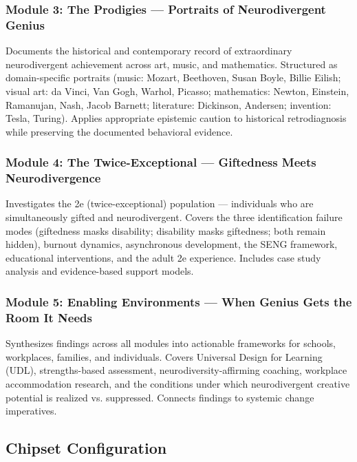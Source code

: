 \documentclass[11pt,letterpaper]{article}
\begin{document}
\subsubsection{Module 3: The Prodigies --- Portraits of Neurodivergent Genius}
Documents the historical and contemporary record of extraordinary neurodivergent achievement across art, music, and mathematics. Structured as domain-specific portraits (music: Mozart, Beethoven, Susan Boyle, Billie Eilish; visual art: da Vinci, Van Gogh, Warhol, Picasso; mathematics: Newton, Einstein, Ramanujan, Nash, Jacob Barnett; literature: Dickinson, Andersen; invention: Tesla, Turing). Applies appropriate epistemic caution to historical retrodiagnosis while preserving the documented behavioral evidence.

\subsubsection{Module 4: The Twice-Exceptional --- Giftedness Meets Neurodivergence}
Investigates the 2e (twice-exceptional) population — individuals who are simultaneously gifted and neurodivergent. Covers the three identification failure modes (giftedness masks disability; disability masks giftedness; both remain hidden), burnout dynamics, asynchronous development, the SENG framework, educational interventions, and the adult 2e experience. Includes case study analysis and evidence-based support models.

\subsubsection{Module 5: Enabling Environments --- When Genius Gets the Room It Needs}
Synthesizes findings across all modules into actionable frameworks for schools, workplaces, families, and individuals. Covers Universal Design for Learning (UDL), strengths-based assessment, neurodiversity-affirming coaching, workplace accommodation research, and the conditions under which neurodivergent creative potential is realized vs. suppressed. Connects findings to systemic change imperatives.

\subsection{Chipset Configuration}
\end{document}
